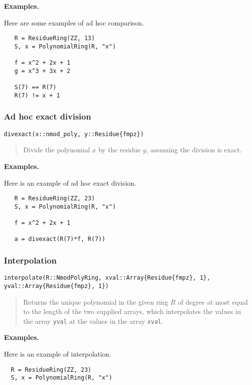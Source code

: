 \documentclass[a4paper,10pt]{article}
\newcommand{\code}{\lstinline}
\newcommand{\desc}[1]{\vspace{-3mm}\begin{quote}#1\end{quote}}
\begin{document}
{{\textbf{Examples.}

Here are some examples of ad hoc comparison.

\begin{lstlisting}
   R = ResidueRing(ZZ, 13)
   S, x = PolynomialRing(R, "x")

   f = x^2 + 2x + 1
   g = x^3 + 3x + 2

   S(7) == R(7)
   R(7) != x + 1
\end{lstlisting}

\subsubsection{Ad hoc exact division}

\begin{lstlisting}
divexact(x::nmod_poly, y::Residue{fmpz})
\end{lstlisting}

\desc{Divide the polynomial $x$ by the residue $y$, assuming the division is exact.}

\textbf{Examples.}

Here is an example of ad hoc exact division.

\begin{lstlisting}
   R = ResidueRing(ZZ, 23)
   S, x = PolynomialRing(R, "x")

   f = x^2 + 2x + 1
   
   a = divexact(R(7)*f, R(7)) 
\end{lstlisting}

\subsubsection{Interpolation}

\begin{lstlisting}
interpolate(R::NmodPolyRing, xval::Array{Residue{fmpz}, 1}, yval::Array{Residue{fmpz}, 1})
\end{lstlisting}

\desc{Returns the unique polynomial in the given ring $R$ of degree at most equal to the
length of the two supplied arrays, which interpolates the values in the array \code{yval}
at the values in the array \code{xval}.}

\textbf{Examples.}

Here is an example of interpolation.

\begin{lstlisting}
  R = ResidueRing(ZZ, 23)
  S, x = PolynomialRing(R, "x")


\end{lstlisting}}}
\end{document}
